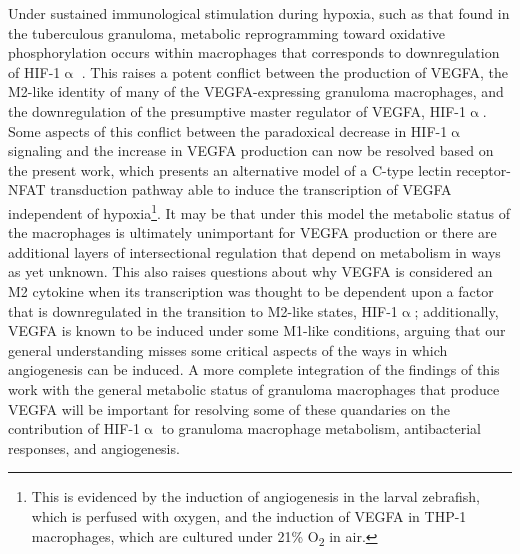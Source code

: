 Under sustained immunological stimulation during hypoxia, such as that found in the tuberculous granuloma, metabolic reprogramming toward oxidative phosphorylation occurs within macrophages that corresponds to downregulation of HIF\hyp{}1$\upalpha$ \citep{Wilson2019, Mehrotra2014}. This raises a potent conflict between the production of VEGFA, the M2\hyp{}like identity of many of the VEGFA\hyp{}expressing granuloma macrophages, and the downregulation of the presumptive master regulator of VEGFA, HIF\hyp{}1$\upalpha$. Some aspects of this conflict between the paradoxical decrease in HIF\hyp{}1$\upalpha$ signaling and the increase in VEGFA production can now be resolved based on the present work, which presents an alternative model of a C\hyp{}type lectin receptor\hyp{}NFAT transduction pathway able to induce the transcription of VEGFA independent of hypoxia\footnote{This is evidenced by the induction of angiogenesis in the larval zebrafish, which is perfused with oxygen, and the induction of VEGFA in THP\hyp{}1 macrophages, which are cultured under 21\% O\textsubscript{2} in air.}. It may be that under this model the metabolic status of the macrophages is ultimately unimportant for VEGFA production or there are additional layers of intersectional regulation that depend on metabolism in ways as yet unknown. This also raises questions about why VEGFA is considered an M2 cytokine when its transcription was thought to be dependent upon a factor that is downregulated in the transition to M2\hyp{}like states, HIF\hyp{}1$\upalpha$; additionally, VEGFA is known to be induced under some M1\hyp{}like conditions, arguing that our general understanding misses some critical aspects of the ways in which angiogenesis can be induced. A more complete integration of the findings of this work with the general metabolic status of granuloma macrophages that produce VEGFA will be important for resolving some of these quandaries on the contribution of HIF\hyp{}1$\upalpha$ to granuloma macrophage metabolism, antibacterial responses, and angiogenesis.

